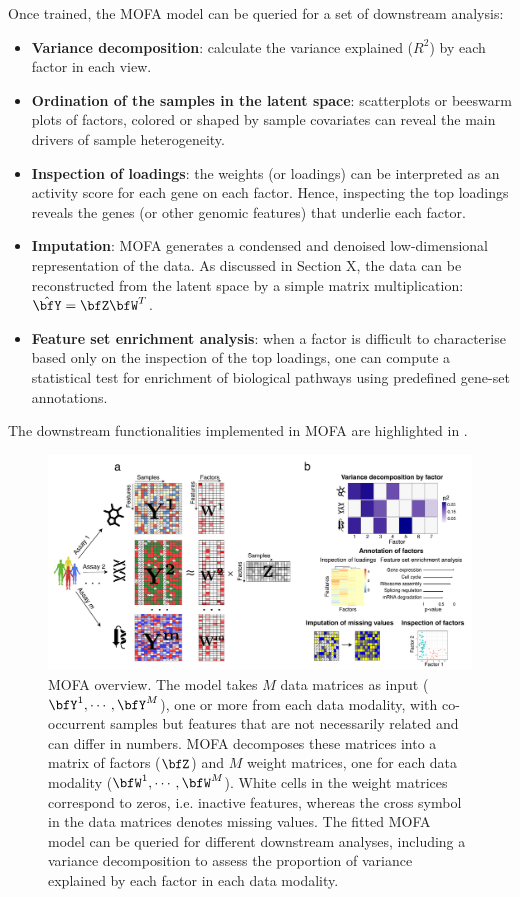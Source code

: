 Once trained, the MOFA model can be queried for a set of downstream analysis:
\begin{itemize}
	\item \textbf{Variance decomposition}: calculate the variance explained ($R^2$) by each factor in each view. 
	\item \textbf{Ordination of the samples in the latent space}: scatterplots or beeswarm plots of factors, colored or shaped by sample covariates can reveal the main drivers of sample heterogeneity.
	\item \textbf{Inspection of loadings}: the weights (or loadings) can be interpreted as an activity score for each gene on each factor. Hence, inspecting the top loadings reveals the genes (or other genomic features) that underlie each factor.
	\item \textbf{Imputation}: MOFA generates a condensed and denoised low-dimensional representation of the data. As discussed in Section X, the data can be reconstructed from the latent space by a simple matrix multiplication: $\hat{\bfY} = \bfZ \bfW^T$. 
	\item \textbf{Feature set enrichment analysis}: when a factor is difficult to characterise based only on the inspection of the top loadings, one can compute a statistical test for enrichment of biological pathways using predefined gene-set annotations.
\end{itemize}

The downstream functionalities implemented in MOFA are highlighted in .

\begin{figure}[H]
	\begin{center}
		\includegraphics[width=1.0\textwidth]{MOFA}
		\caption{MOFA overview. The model takes $M$ data matrices as input ($\bfY^1, \cdots, \bfY^M$), one or more from each data modality, with co-occurrent samples but features that are not necessarily related and can differ in numbers. MOFA decomposes these matrices into a matrix of factors ($\bfZ$) and $M$ weight matrices, one for each data modality ($\bfW^1, \cdots, \bfW^M$). White cells in the weight matrices correspond to zeros, i.e. inactive features, whereas the cross symbol in the data matrices denotes missing values. The fitted MOFA model can be queried for different downstream analyses, including a variance decomposition to assess the proportion of variance explained by each factor in each data modality.}
		\label{fig:MOFA}
	\end{center}
\end{figure}

